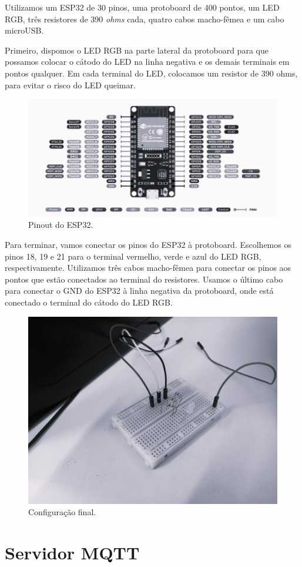 \documentclass[12pt]{article}
\begin{document}
Utilizamos um ESP32 de 30 pinos, uma protoboard de 400 pontos, um LED RGB, três resistores de 390 \textit{ohms} cada, quatro cabos macho-fêmea e um cabo microUSB.

Primeiro, dispomos o LED RGB na parte lateral da protoboard para que possamos colocar o cátodo do LED na linha negativa e os demais terminais em pontos qualquer. Em cada terminal do LED, colocamos um resistor de 390 ohms, para evitar o risco do LED queimar.

\begin{figure}[H]
    \centering
    \includegraphics[width=0.5\linewidth]{img/esp32_pinout.png}
    \caption{Pinout do ESP32.}
    \label{fig:esp32-pinout}
\end{figure}

Para terminar, vamos conectar os pinos do ESP32 à protoboard. Escolhemos os pinos 18, 19 e 21 para o terminal vermelho, verde e azul do LED RGB, respectivamente. Utilizamos três cabos macho-fêmea para conectar os pinos aos pontos que estão conectados ao terminal do resistores. Usamos o último cabo para conectar o GND do ESP32 à linha negativa da protoboard, onde está conectado o terminal do cátodo do LED RGB.

\begin{figure}[H]
    \centering
    \includegraphics[width=0.5\linewidth]{img/20241125_095139.jpg}
    \caption{Configuração final.}
    \label{fig:final-config}
\end{figure}

\section{Servidor MQTT}
\end{document}
